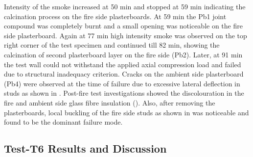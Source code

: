 Intensity of the smoke increased at 50 min and stopped at 59 min indicating the calcination process on the fire side plasterboards. At 59 min the Pb1 joint compound was completely burnt and a small opening was noticeable on the fire side plasterboard. Again at 77 min high intensity smoke was observed on the top right corner of the test specimen and continued till 82 min, showing the calcination of second plasterboard layer on the fire side (Pb2). Later, at 91 min the test wall could not withstand the applied axial compression load and failed due to structural inadequacy criterion. Cracks on the ambient side plasterboard (Pb4) were observed at the time of failure due to excessive lateral deflection in studs as shown in . Post-fire test investigations showed the discolouration in the fire and ambient side glass fibre insulation (). Also, after removing the plasterboards, local buckling of the fire side studs as shown in  was noticeable and found to be the dominant failure mode.

\subsection{Test-T6 Results and Discussion}

